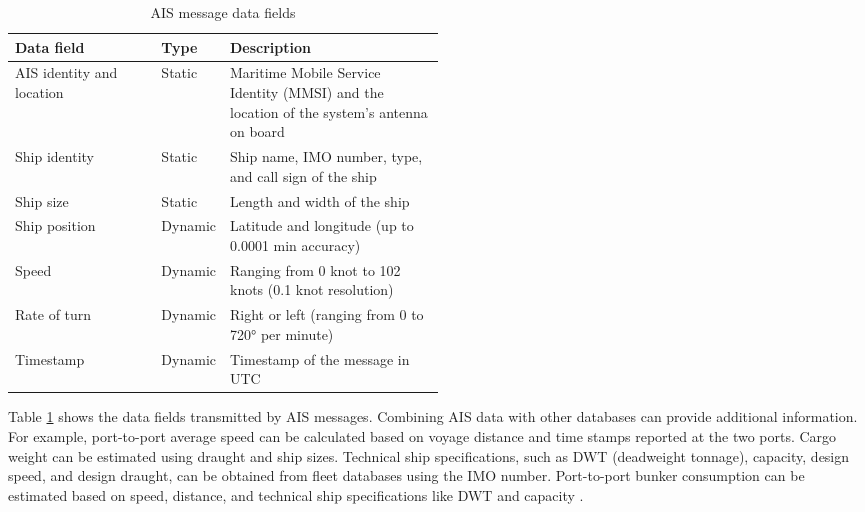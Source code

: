 \begin{table}[ht]
    \centering
    \begin{tabular}{|l|l|p{0.5\linewidth}|}
        \hline
        \textbf{Data field}       & \textbf{Type} & \textbf{Description}                                                                      \\
        \hline
        AIS identity and location & Static        & Maritime Mobile Service Identity (MMSI) and the location of the system's antenna on board \\
        \hline
        Ship identity             & Static        & Ship name, IMO number, type, and call sign of the ship                                    \\
        \hline
        Ship size                 & Static        & Length and width of the ship                                                              \\
        \hline
        Ship position             & Dynamic       & Latitude and longitude (up to 0.0001 min accuracy)                                        \\
        \hline
        Speed                     & Dynamic       & Ranging from 0 knot to 102 knots (0.1 knot resolution)                                    \\
        \hline
        Rate of turn              & Dynamic       & Right or left (ranging from 0 to 720° per minute)                                         \\
        \hline
        Timestamp                 & Dynamic       & Timestamp of the message in UTC                                                           \\
        \hline
    \end{tabular}
    \caption{AIS message data fields \autocite{perez2009automatic}}
    \label{tab:ais_message}
\end{table}


Table \ref{tab:ais_message} shows the data fields transmitted by AIS messages.
Combining AIS data with other databases can provide additional information.
For example, port-to-port average speed can be calculated based on voyage distance and time stamps reported at the two ports.
Cargo weight can be estimated using draught and ship sizes. Technical ship specifications, such as DWT (deadweight tonnage), capacity, design speed, and design draught, can be obtained from fleet databases using the IMO number.
Port-to-port bunker consumption can be estimated based on speed, distance, and technical ship specifications like DWT and capacity \autocite{yang2019big}.


